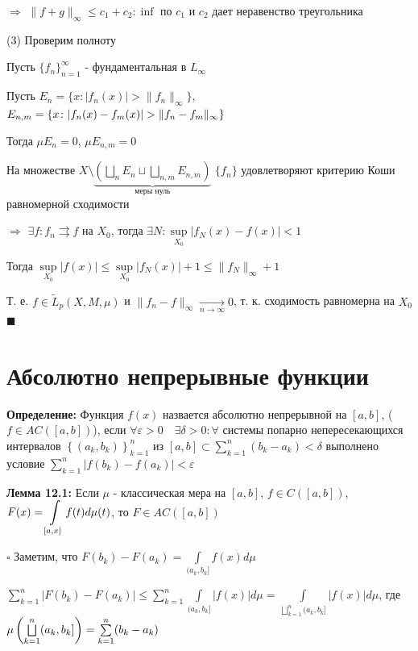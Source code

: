 \documentclass[a4paper]{report}
\newcommand*{\hm}[1]{#1\nobreak\discretionary{}%
            {\hbox{$\mathsurround=0pt #1$}}{}}
\begin{document}
$\Rightarrow$ $\|f+g\|_\infty\le c_1+c_2\colon\inf$ по $c_1$ и $c_2$ дает неравенство треугольника

(3) Проверим полноту

Пусть $\{f_n\}_{n=1}^\infty$ - фундаментальная в $L_\infty$

Пусть $E_n=\{x\colon|f_n(x)|>\|f_n\|_\infty\}$, $E_{n,m}=\{x\colon|f_n(x)-f_m(x)|>\|f_n\hm-f_m\|_\infty\}$

Тогда $\mu E_n=0$, $\mu E_{n,m}=0$

На множестве $X\setminus\underbrace{\left(\bigsqcup\limits_n E_n\sqcup\bigsqcup\limits_{n,m}E_{n,m}\right)}_{\text{меры нуль}}$ $\{f_n\}$ удовлетворяют критерию Коши равномерной сходимости

$\Rightarrow$ $\exists f\colon f_n\rightrightarrows f$ на $X_0$, тогда $\exists N\colon \sup\limits_{X_0}|f_N(x)-f(x)|<1$

Тогда $\sup\limits_{X_0}|f(x)|\le\sup\limits_{X_0}|f_N(x)|+1\le\|f_N\|_\infty+1$

Т. е. $f\in\tilde L_p(X,M,\mu)$ и $\|f_n-f\|_\infty\xrightarrow[n\to\infty]{}0$, т. к. сходимость равномерна на $X_0$ $\blacksquare$







\chapter{Абсолютно непрерывные функции}

\noindent\textbf{Определение:} Функция $f(x)$ назвается абсолютно непрерывной на $[a,b]$, ($f\in AC([a,b])$), если $\forall\varepsilon>0\quad\exists\delta>0\colon\forall$ системы попарно непересекающихся интервалов $\left\{(a_k,b_k)\right\}_{k=1}^n$ из $[a,b]\subset\sum\limits_{k=1}^n(b_k-a_k)<\delta$ выполнено условие
$\sum\limits_{k=1}^n|f(b_k)-f(a_k)|<\varepsilon$
\bigskip

\noindent\textbf{Лемма 12.1:} Если $\mu$ - классическая мера на $[a,b]$, $f\in C([a,b])$, $F(x)\hm=\displaystyle\int\limits_{[a,x]}f(t)d\mu(t)$, то $F\in AC([a,b])$

\noindent $\square$ Заметим, что $F(b_k)-F(a_k)=\displaystyle\int\limits_{(a_k,b_k]}f(x)d\mu$

$\sum\limits_{k=1}^n|F(b_k)-F(a_k)|\le\sum\limits_{k=1}^n\displaystyle\int\limits_{(a_k,b_k]}|f(x)|d\mu=\displaystyle\int\limits_{\bigsqcup\limits_{k=1}^n(a_k,b_k]}|f(x)|d\mu$, где $\mu\left(\bigsqcup\limits_{k=1}^n(a_k,b_k]\right)\hm=\sum\limits_{k=1}^n(b_k-a_k)$
\end{document}
